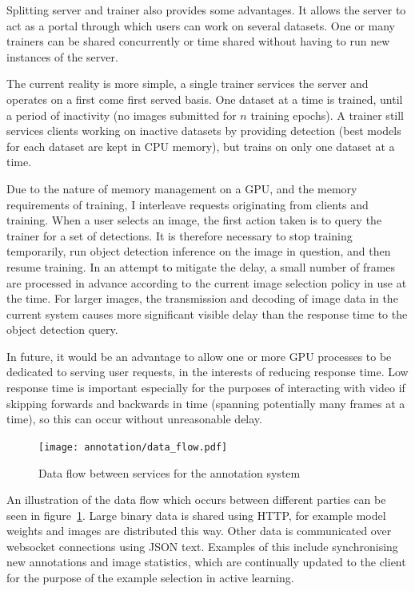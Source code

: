 Splitting server and trainer also provides some advantages. It allows the server to act as a portal through which users can work on several datasets. One or many trainers can be shared concurrently or time shared without having to run new instances of the server. 

The current reality is more simple, a single trainer services the server and operates on a first come first served basis. One dataset at a time is trained, until a period of inactivity (no images submitted for $ n $ training epochs). A trainer still services clients working on inactive datasets by providing detection (best models for each dataset are kept in \gls{CPU} memory), but trains on only one dataset at a time. 

Due to the nature of memory management on a \gls{GPU}, and the memory requirements of training, I interleave requests originating from clients and training. When a user selects an image, the first action taken is to query the trainer for a set of detections. It is therefore necessary to stop training temporarily, run object detection inference on the image in question, and then resume training. In an attempt to mitigate the delay, a small number of frames are processed in advance according to the current image selection policy in use at the time. For larger images, the transmission and decoding of image data in the current system causes more significant visible delay than the response time to the object detection query.

In future, it would be an advantage to allow one or more \gls{GPU} processes to be dedicated to serving user requests, in the interests of reducing response time. Low response time is important especially for the purposes of interacting with video if skipping forwards and backwards in time (spanning potentially many frames at a time), so this can occur without unreasonable delay.

\begin{figure}[h!]
  \centering
  \texttt{[image: annotation/data\_flow.pdf]}
  \caption{Data flow between services for the annotation system}  
  \label{fig:data_flow}
\end{figure}

An illustration of the data flow which occurs between different parties can be seen in figure~\ref{fig:data_flow}. Large binary data is shared using \gls{HTTP}, for example model weights and images are distributed this way. Other data is communicated over websocket connections using \gls{JSON} text. Examples of this include synchronising new annotations and image statistics, which are continually updated to the client for the purpose of the example selection in active learning.

